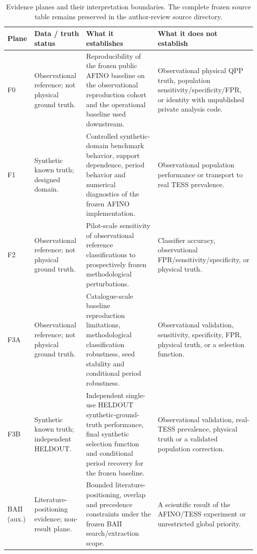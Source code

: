 \begin{table}[htbp]
\centering
\caption{Evidence planes and their interpretation boundaries. The complete frozen source table remains preserved in the author-review source directory.}
\label{tab:evidence_planes}
\small
\begin{tabularx}{\textwidth}{@{}>{\RaggedRight\arraybackslash}p{1.15cm}>{\RaggedRight\arraybackslash}p{3.25cm}>{\RaggedRight\arraybackslash}X>{\RaggedRight\arraybackslash}X@{}}
\toprule
Plane & Data / truth status & What it establishes & What it does not establish \\
\midrule
F0 & Observational reference; not physical ground truth. & Reproducibility of the frozen public AFINO baseline on the observational reproduction cohort and the operational baseline used downstream. & Observational physical QPP truth, population sensitivity/specificity/FPR, or identity with unpublished private analysis code. \\
F1 & Synthetic known truth; designed domain. & Controlled synthetic-domain benchmark behavior, support dependence, period behavior and numerical diagnostics of the frozen AFINO implementation. & Observational population performance or transport to real TESS prevalence. \\
F2 & Observational reference; not physical ground truth. & Pilot-scale sensitivity of observational reference classifications to prospectively frozen methodological perturbations. & Classifier accuracy, observational FPR/sensitivity/specificity, or physical truth. \\
F3A & Observational reference; not physical ground truth. & Catalogue-scale baseline reproduction limitations, methodological classification robustness, seed stability and conditional period robustness. & Observational validation, sensitivity, specificity, FPR, physical truth, or a selection function. \\
F3B & Synthetic known truth; independent HELDOUT. & Independent single-use HELDOUT synthetic-ground-truth performance, final synthetic selection function and conditional period recovery for the frozen baseline. & Observational validation, real-TESS prevalence, physical truth or a validated population correction. \\
BAII (aux.) & Literature-positioning evidence; non-result plane. & Bounded literature-positioning, overlap and precedence constraints under the frozen BAII search/extraction scope. & A scientific result of the AFINO/TESS experiment or unrestricted global priority. \\
\bottomrule
\end{tabularx}
\end{table}

